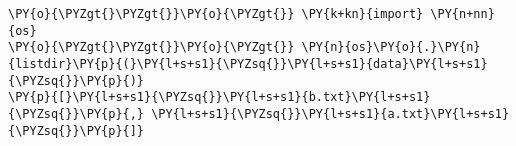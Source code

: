 \begin{Verbatim}[commandchars=\\\{\}]
\PY{o}{\PYZgt{}\PYZgt{}}\PY{o}{\PYZgt{}} \PY{k+kn}{import} \PY{n+nn}{os}
\PY{o}{\PYZgt{}\PYZgt{}}\PY{o}{\PYZgt{}} \PY{n}{os}\PY{o}{.}\PY{n}{listdir}\PY{p}{(}\PY{l+s+s1}{\PYZsq{}}\PY{l+s+s1}{data}\PY{l+s+s1}{\PYZsq{}}\PY{p}{)}
\PY{p}{[}\PY{l+s+s1}{\PYZsq{}}\PY{l+s+s1}{b.txt}\PY{l+s+s1}{\PYZsq{}}\PY{p}{,} \PY{l+s+s1}{\PYZsq{}}\PY{l+s+s1}{a.txt}\PY{l+s+s1}{\PYZsq{}}\PY{p}{]}
\end{Verbatim}
